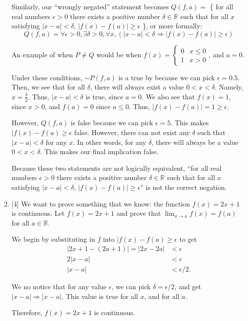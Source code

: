 \documentclass{article}
\begin{document}
\begin{enumerate}
{        Similarly, our ``wrongly negated'' statement becomes \(Q(f, a) = \) \{
            for all real numbers \(\epsilon > 0\) there exists a 
            positive number \(\delta \in \mathbb{R}\) such that for all \(x\) satisfying
            \(|x - a| < \delta\), \(|f(x) - f(a)| \ge \epsilon\)
        \}, or more formally:
        \[Q(f, a) = \forall \epsilon > 0, \exists \delta > 0, \forall x, (|x - a| < \delta \Rightarrow |f(x) - f(a)| \ge \epsilon)\]

        An example of when \(P \not= Q\) would be when
        \(
        f(x) = 
        \begin{cases}
            0 & x \le 0\\
            1 & x > 0
        \end{cases}
        \), and \(a = 0\).

        Under these conditions, \(\sim P(f, a)\) is a true by because we can pick 
        \(\epsilon = 0.5\). Then, we see that for all \(\delta\), there will always 
        exist a value \(0 < x < \delta\). Namely, \(x = \frac{\delta}{2}\). Thus, 
        \(|x - a| < \delta\) is true, since \(a = 0\). 
        We also see that \(f(x) = 1\), since \(x > 0\), and \(f(a) = 0\) since \(a \le 0\). 
        Thus, \(|f(x) - f(a)| = 1 \ge \epsilon\). 

        However, \(Q(f, a)\) is false because we can pick \(\epsilon = 5\). This 
        makes \(|f(x) - f(a) \ge \epsilon\) false. However, there can not exist 
        any \(\delta\) such that \(|x - a| < \delta\) for any \(x\). In other words,
        for any \(\delta\), there will always be a value \(0 < x < \delta\). This 
        makes our final implication false. 

        Because these two statements are not logically equivalent, 
        ``for all real numbers \(\epsilon > 0\) there exists a 
        positive number \(\delta \in \mathbb{R}\) such that for all \(x\) satisfying
        \(|x - a| < \delta\), \(|f(x) - f(a)| \ge \epsilon\)'' is not the correct 
        negation. 
    }

    \item {
        [4] We want to prove something that we know: the function \(f(x) = 2x+1\) 
        is continuous. Let \(f(x) = 2x+1\) and prove that \(\displaystyle \lim_{x \to a} f(x) = f(a)\)
        for all \(a \in \mathbb{R}\).

        We begin by substituting in \(f\) into \(|f(x) - f(a) \ge \epsilon\)
        to get 
        \begin{align*}
            |2x + 1 - (2a + 1)| = |2x - 2a| &< \epsilon\\
            2|x - a| &< \epsilon \\
            |x - a| &< \epsilon / 2.
        \end{align*}

        We no notice that for any value \(\epsilon\), we can pick \(\delta = \epsilon / 2\),
        and get \(|x - a| \Rightarrow |x - a|\). This value is true for all \(x\), 
        and for all \(a\). 

        Therefore, \(f(x) = 2x + 1\) is continuous.
    }
\end{enumerate}



\end{document}

